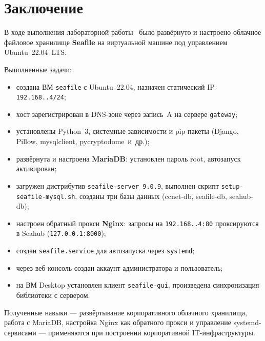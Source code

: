 \chapter*{Заключение}
\label{ch:conclusion}

В ходе выполнения лабораторной работы~\cfgLabNumber{} было развёрнуто и
настроено облачное файловое хранилище \textbf{Seafile} на виртуальной машине
под управлением Ubuntu~22.04~LTS.

Выполненные задачи:
\begin{itemize}
  \item создана ВМ \texttt{seafile} с Ubuntu~22.04, назначен статический
        IP \texttt{192.168.\cfgLabStudentN.4/24};
  \item хост зарегистрирован в DNS-зоне через запись~A на сервере \texttt{gateway};
  \item установлены Python~3, системные зависимости и pip-пакеты
        (Django, Pillow, mysqlclient, pycryptodome~и~др.);
  \item развёрнута и настроена \textbf{MariaDB}: установлен пароль root,
        автозапуск активирован;
  \item загружен дистрибутив \texttt{seafile-server\_9.0.9},
        выполнен скрипт \texttt{setup-seafile-mysql.sh},
        созданы три базы данных (ccnet-db, seafile-db, seahub-db);
  \item настроен обратный прокси \textbf{Nginx}: запросы на
        \texttt{192.168.\cfgLabStudentN.4:80} проксируются в Seahub
        (\texttt{127.0.0.1:8000});
  \item создан \texttt{seafile.service} для автозапуска через \texttt{systemd};
  \item через веб-консоль создан аккаунт администратора и пользователь;
  \item на ВМ Desktop установлен клиент \texttt{seafile-gui},
        произведена синхронизация библиотеки с сервером.
\end{itemize}

Полученные навыки — развёртывание корпоративного облачного хранилища,
работа с MariaDB, настройка Nginx как обратного прокси и управление
systemd-сервисами — применяются при построении корпоративной IT-инфраструктуры.

\endinput